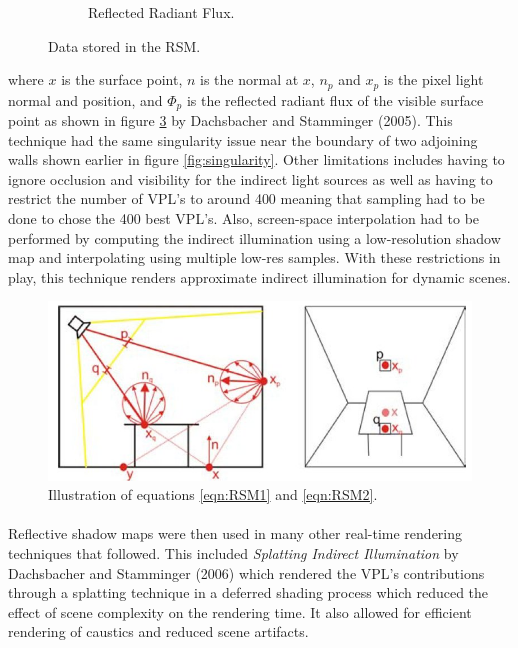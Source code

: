\begin{figure}
\begin{subfigure}[b]{0.4\textwidth}
                \caption{Reflected Radiant Flux.}
                \label{fig:RSM3}
        \end{subfigure}
        \caption{Data stored in the RSM.}\label{fig:RSM}
\end{figure}

where $x$ is the surface point, $n$ is the normal at $x$, $n_{p}$ and $x_{p}$ is the pixel light normal and position, and $\Phi_{p}$ is the reflected radiant flux of the visible surface point as shown in figure \ref{fig:RSMcalc} by Dachsbacher and Stamminger (2005).  This technique had the same singularity issue near the boundary of two adjoining walls shown earlier in figure \ref{fig:singularity}.  Other limitations includes having to ignore occlusion and visibility for the indirect light sources as well as having to restrict the number of VPL's to around 400 meaning that sampling had to be done to chose the 400 best VPL's.  Also, screen-space interpolation had to be performed by computing the indirect illumination using a low-resolution shadow map and interpolating using multiple low-res samples.  With these restrictions in play, this technique renders approximate indirect illumination for dynamic scenes.

\begin{figure}[h!]
  \centering
    \includegraphics[width=1.0\textwidth]{RSMcalc.jpg}
  \caption{Illustration of equations \ref{eqn:RSM1} and \ref{eqn:RSM2}.}
	\label{fig:RSMcalc}
\end{figure}

\paragraph{}
Reflective shadow maps were then used in many other real-time rendering techniques that followed.  This included \textit{Splatting Indirect Illumination} by Dachsbacher and Stamminger (2006) which rendered the VPL's contributions through a splatting technique in a deferred shading process which reduced the effect of scene complexity on the rendering time.  It also allowed for efficient rendering of caustics and reduced scene artifacts.

